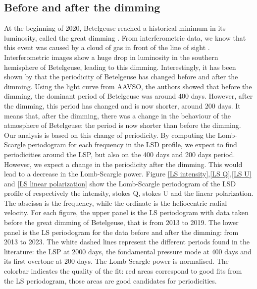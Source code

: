 \documentclass{aa}
\begin{document}
\subsection{Before and after the dimming}

At the beginning of 2020, Betelgeuse reached a historical minimum in its luminosity, called the great dimming \citep{Guinan2020}. 
From interferometric data, we know that this event was caused by a cloud of gas in front of the line of sight \citep{Montargès2021}. 
Interferometric images show a huge drop in luminosity in the southern hemisphere of Betelgeuse, leading to this dimming. Interestingly, 
it has been shown by \cite{jadlovsky2022} that the periodicity of Betelgeuse has changed before and after the dimming. Using the light curve from AAVSO, 
the authors showed that before the dimming, the dominant period of Betelgeuse was around 400 days. However, after the dimming, this period has changed and 
is now shorter, around 200 days. It means that, after the dimming, there was a change in the behaviour of the atmosphere of Betelgeuse: the period is now
shorter than before the dimming. Our analysis is based on this change of periodicity. By computing the Lomb-Scargle periodogram for each frequency 
in the LSD profile, we expect to find periodicities around the LSP, but also on the 400 days and 200 days period. However, we expect a change
in the periodicity after the dimming. This would lead to a decrease in the Lomb-Scargle power. 
Figure \ref{LS intensity},\ref{LS Q},\ref{LS U} and \ref{LS linear polarization} show the Lomb-Scargle periodogram of the LSD profile of respectively 
the intensity, stokes Q, stokes U and the linear polarization. The abscissa is the frequency, while the ordinate is the heliocentric radial velocity. 
For each figure, the upper panel is the LS periodogram with data taken before the great dimming of Betelgeuse, that is from 2013 to 2019. 
The lower panel is the LS periodogram for the data before and after the dimming: from 2013 to 2023. The white dashed lines represent the different 
periods found in the literature: the LSP at 2000 days, the fondamental pressure mode at 400 days and its first overtone at 200 days. The Lomb-Scargle 
power is normalised. The colorbar indicates the quality of the fit: red areas correspond to good fits from the LS periodogram, those areas are good 
candidates for periodicities. 
\end{document}
